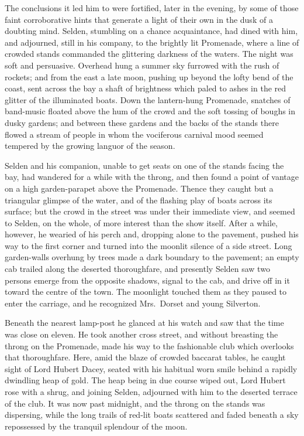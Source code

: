 \documentclass[12pt,a4paper]{book}
\begin{document}
The conclusions it led him to were fortified, later in the
evening, by some of those faint corroborative hints that generate
a light of their own in the dusk of a doubting mind. Selden,
stumbling on a chance acquaintance, had dined with him, and
adjourned, still in his company, to the brightly lit Promenade,
where a line of crowded stands commanded the glittering darkness
of the waters. The night was soft and persuasive. Overhead hung
a summer sky furrowed with the rush of rockets; and from
the east a late moon, pushing up beyond the lofty bend of the
coast, sent across the bay a shaft of brightness which paled to
ashes in the red glitter of the illuminated boats. Down the
lantern-hung Promenade, snatches of band-music floated above the
hum of the crowd and the soft tossing of boughs in dusky gardens;
and between these gardens and the backs of the stands there
flowed a stream of people in whom the vociferous carnival mood
seemed tempered by the growing languor of the season.





Selden and his companion, unable to get seats on one of the
stands facing the bay, had wandered for a while with the throng,
and then found a point of vantage on a high garden-parapet above
the Promenade. Thence they caught but a triangular glimpse of
the water, and of the flashing play of boats across its surface;
but the crowd in the street was under their immediate view, and
seemed to Selden, on the whole, of more interest than the show
itself. After a while, however, he wearied of his perch and,
dropping alone to the pavement, pushed his way to the first
corner and turned into the moonlit silence of a side street. Long
garden-walls overhung by trees made a dark boundary to the
pavement; an empty cab trailed along the deserted thoroughfare,
and presently Selden saw two persons emerge from the opposite
shadows, signal to the cab, and drive off in it toward the centre
of the town. The moonlight touched them as they paused to enter
the carriage, and he recognized Mrs.\ Dorset and young Silverton.





Beneath the nearest lamp-post he glanced at his watch and saw
that the time was close on eleven. He took another cross street,
and without breasting the throng on the Promenade, made his way
to the fashionable club which overlooks that thoroughfare. Here,
amid the blaze of crowded baccarat tables, he caught sight of
Lord Hubert Dacey, seated with his habitual worn smile behind a
rapidly dwindling heap of gold. The heap being in due course
wiped out, Lord Hubert rose with a shrug, and joining Selden,
adjourned with him to the deserted terrace of the club. It was
now past midnight, and the throng on the stands was dispersing,
while the long trails of red-lit boats scattered and faded
beneath a sky repossessed by the tranquil splendour of the moon.
\end{document}
